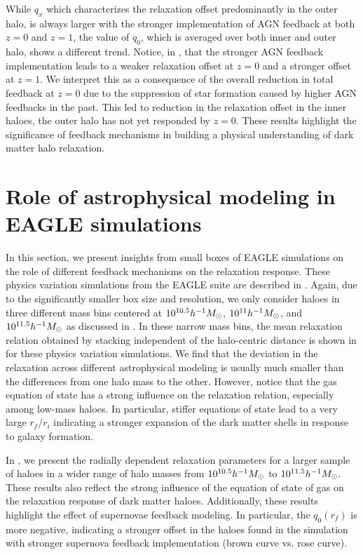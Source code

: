 %
%
%
While $q_x$ which characterizes the relaxation offset predominantly in the outer halo, is always larger with the stronger implementation of AGN feedback at both \( z=0 \) and \( z=1 \), the value of $q_0$, which is averaged over both inner and outer halo, shows a different trend.  Notice, in , that the stronger AGN feedback implementation leads to a weaker relaxation offset at \( z=0 \) and a stronger offset at \( z=1 \).  We interpret this as a consequence of the overall reduction in total feedback at \( z=0 \) due to the suppression of star formation caused by higher AGN feedbacks in the past. This led to reduction in the relaxation offset in the inner haloes, the outer halo has not yet responded by $z=0$. These results highlight the significance of feedback mechanisms in building a physical understanding of dark matter halo relaxation.










\section{Role of astrophysical modeling in EAGLE simulations}
\label{sec:res-physvar-eagle}

In this section, we present insights from small boxes of EAGLE simulations on the role of different feedback mechanisms on the relaxation response. These physics variation simulations from the EAGLE suite are described in . Again, due to the significantly smaller box size and resolution, we only consider haloes in three different mass bins centered at $10^{10.5} h^{-1}M_{\odot}$, $10^{11} h^{-1}M_{\odot}$, and $10^{11.5} h^{-1}M_{\odot}$ as discussed in . In these narrow mass bins, the mean relaxation relation obtained by stacking independent of the halo-centric distance is shown in  for these physics variation simulations. We find that the deviation in the relaxation across different astrophysical modeling is usually much smaller than the differences from one halo mass to the other. However, notice that the gas equation of state has a strong influence on the relaxation relation, especially among low-mass haloes. In particular, stiffer equations of state lead to a very large $r_f/r_i$ indicating a stronger expansion of the dark matter shells in response to galaxy formation.

In , we present the radially dependent relaxation parameters for a larger sample of haloes in a wider range of halo masses from $10^{10.5} h^{-1}M_{\odot}$ to $10^{11.5} h^{-1}M_{\odot}$. These results also reflect the strong influence of the equation of state of gas on the relaxation response of dark matter haloes. Additionally, these results highlight the effect of supernovae feedback modeling. In particular, the $q_0(r_f)$ is more negative, indicating a stronger offset in the haloes found in the simulation with stronger supernova feedback implementation (brown curve vs. rose curve).    

